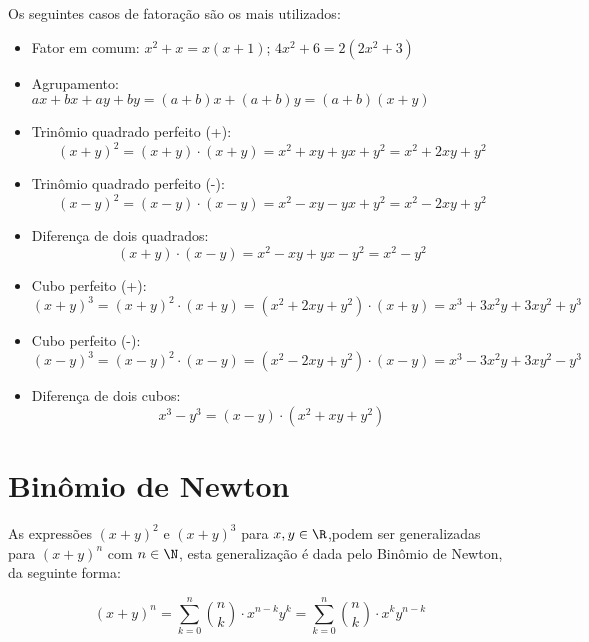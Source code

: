  Os seguintes casos de fatoração são os mais utilizados:
 \begin{itemize}
  \item Fator em comum: $x^2 + x= x(x + 1)$; $4x^2 + 6= 2(2x^2 + 3)$
  \item Agrupamento: $ax + bx + ay + by= (a+b)x+(a+b)y= (a+b)(x+y)$
  \item Trinômio quadrado perfeito (+): 
\begin{equation}
(x + y)^2= (x+y) \cdot (x+y)= x^2 + xy + yx + y^2= x^2 + 2xy + y^2
\end{equation}
  \item Trinômio quadrado perfeito (-): 
\begin{equation}
(x - y)^2= (x - y) \cdot (x - y)= x^2 - xy - yx + y^2 = x^2 - 2xy + y^2
\end{equation}
  \item Diferença de dois quadrados: 
\begin{equation}
(x + y) \cdot (x - y)= x^2 - xy + yx - y^2 = x^2 - y^2
\end{equation}
  \item Cubo perfeito (+): 
\begin{equation}
(x+y)^3= (x+y)^2 \cdot (x+y)= (x^2 + 2xy + y^2) \cdot (x+y)  =x^3 + 3x^2y + 3xy^2 + y^3
\end{equation}
  \item Cubo perfeito (-): 
\begin{equation}
(x-y)^3= (x-y)^2 \cdot (x-y)= (x^2 - 2xy + y^2) \cdot (x-y)= x^3 - 3x^2y + 3xy^2 - y^3
\end{equation}
  \item Diferença de dois cubos:
\begin{equation}
x^3 - y^3= (x-y) \cdot (x^2 + xy + y^2)
\end{equation}
 \end{itemize}
 
 \section{Binômio de Newton}
 
 As expressões $(x + y)^2$ e $(x + y)^3$ para $x, y \in \R$,podem ser generalizadas para $(x + y)^n$ com $n \in \N$, esta generalização é dada pelo Binômio de Newton, da seguinte forma:
 
\begin{equation}
(x + y)^n= \sum^{n}_{k=0} \binom{n}{k} \cdot x^{n-k} y^{k}= \sum^{n}_{k=0} \binom{n}{k} \cdot x^{k} y^{n-k} 
\end{equation}
 
